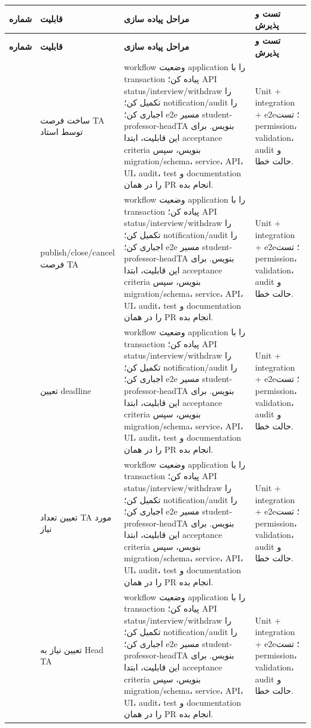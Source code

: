 \documentclass[11pt,a4paper]{article}
\begin{document}
\begin{longtable}{|>{\raggedleft\arraybackslash}p{}|>{\raggedleft\arraybackslash}p{}|>{\raggedleft\arraybackslash}p{}|>{\raggedleft\arraybackslash}p{}|}
\hline
\textbf{شماره} & \textbf{قابلیت} & \textbf{مراحل پیاده سازی} & \textbf{تست و پذیرش} \\\hline
\endfirsthead
\hline
\textbf{شماره} & \textbf{قابلیت} & \textbf{مراحل پیاده سازی} & \textbf{تست و پذیرش} \\\hline
\endhead
51 & ساخت فرصت TA توسط استاد & workflow وضعیت application را با transaction پیاده کن؛ API status/interview/withdraw را تکمیل کن؛ notification/audit را اجباری کن؛ e2e مسیر student-professor-headTA بنویس. برای این قابلیت، ابتدا acceptance criteria بنویس، سپس migration/schema، service، API، UI، audit، test و documentation را در همان PR انجام بده. & Unit + integration + e2e؛ تست permission، validation، audit و حالت خطا. \\ \hline
52 & publish/close/cancel فرصت TA & workflow وضعیت application را با transaction پیاده کن؛ API status/interview/withdraw را تکمیل کن؛ notification/audit را اجباری کن؛ e2e مسیر student-professor-headTA بنویس. برای این قابلیت، ابتدا acceptance criteria بنویس، سپس migration/schema، service، API، UI، audit، test و documentation را در همان PR انجام بده. & Unit + integration + e2e؛ تست permission، validation، audit و حالت خطا. \\ \hline
53 & تعیین deadline & workflow وضعیت application را با transaction پیاده کن؛ API status/interview/withdraw را تکمیل کن؛ notification/audit را اجباری کن؛ e2e مسیر student-professor-headTA بنویس. برای این قابلیت، ابتدا acceptance criteria بنویس، سپس migration/schema، service، API، UI، audit، test و documentation را در همان PR انجام بده. & Unit + integration + e2e؛ تست permission، validation، audit و حالت خطا. \\ \hline
54 & تعیین تعداد TA مورد نیاز & workflow وضعیت application را با transaction پیاده کن؛ API status/interview/withdraw را تکمیل کن؛ notification/audit را اجباری کن؛ e2e مسیر student-professor-headTA بنویس. برای این قابلیت، ابتدا acceptance criteria بنویس، سپس migration/schema، service، API، UI، audit، test و documentation را در همان PR انجام بده. & Unit + integration + e2e؛ تست permission، validation، audit و حالت خطا. \\ \hline
55 & تعیین نیاز به Head TA & workflow وضعیت application را با transaction پیاده کن؛ API status/interview/withdraw را تکمیل کن؛ notification/audit را اجباری کن؛ e2e مسیر student-professor-headTA بنویس. برای این قابلیت، ابتدا acceptance criteria بنویس، سپس migration/schema، service، API، UI، audit، test و documentation را در همان PR انجام بده. & Unit + integration + e2e؛ تست permission، validation، audit و حالت خطا. \\ \hline

\end{longtable}
\end{document}
